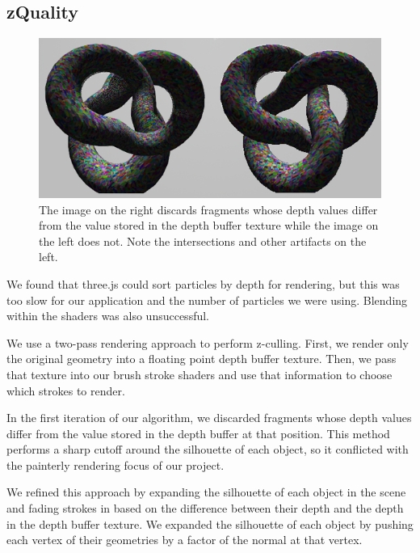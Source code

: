 \documentclass[conference]{acmsiggraph}
\begin{document}
\subsection{zQuality}

\begin{figure}[ht] %
  \centering
  \includegraphics[width=6.0in]{images/torus_depth_test_demo}
  \caption{The image on the right discards fragments whose depth values differ
           from the value stored in the depth buffer texture while the image on
           the left does not. Note the intersections and other artifacts on the
           left.}
\end{figure}

We found that three.js could sort particles by depth for rendering, but this
was too slow for our application and the number of particles we were using.
Blending within the shaders was also unsuccessful.

We use a two-pass rendering approach to perform z-culling. First, we render
only the original geometry into a floating point depth buffer texture. Then, we
pass that texture into our brush stroke shaders and use that information to
choose which strokes to render.

In the first iteration of our algorithm, we discarded fragments whose depth
values differ from the value stored in the depth buffer at that position. This
method performs a sharp cutoff around the silhouette of each object, so it
conflicted with the painterly rendering focus of our project.

We refined this approach by expanding the silhouette of each object in the
scene and fading strokes in based on the difference between their depth and the
depth in the depth buffer texture. We expanded the silhouette of each object by
pushing each vertex of their geometries by a factor of the normal at that
vertex.
\end{document}

